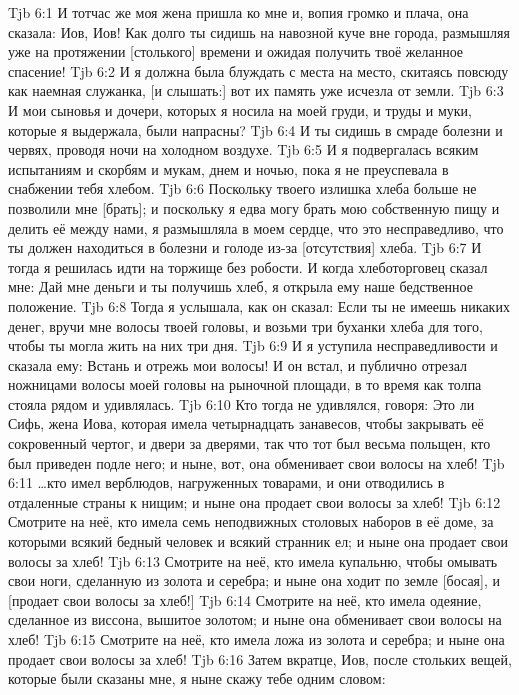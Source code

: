 \vs Tjb 6:1
И тотчас же моя жена пришла ко мне и, вопия громко и плача, она сказала: Иов, Иов! Как долго ты сидишь на навозной куче вне города, размышляя уже на протяжении [столького] времени и ожидая получить твоё желанное спасение!
\vs Tjb 6:2
И я должна была блуждать с места на место, скитаясь повсюду как наемная служанка, [и слышать:] вот их память уже исчезла от земли.
\vs Tjb 6:3
И мои сыновья и дочери, которых я носила на моей груди, и труды и муки, которые я выдержала, были напрасны?
\vs Tjb 6:4
И ты сидишь в смраде болезни и червях, проводя ночи на холодном воздухе.
\vs Tjb 6:5
И я подвергалась всяким испытаниям и скорбям и мукам, днем и ночью, пока я не преуспевала в снабжении тебя хлебом.
\vs Tjb 6:6
Поскольку твоего излишка хлеба больше не позволили мне [брать]; и поскольку я едва могу брать мою собственную пищу и делить её между нами, я размышляла в моем сердце, что это несправедливо, что ты должен находиться в болезни и голоде из-за [отсутствия] хлеба.
\vs Tjb 6:7
И тогда я решилась идти на торжище без робости. И когда хлеботорговец сказал мне: Дай мне деньги и ты получишь хлеб, я открыла ему наше бедственное положение.
\vs Tjb 6:8
Тогда я услышала, как он сказал: Если ты не имеешь никаких денег, вручи мне волосы твоей головы, и возьми три буханки хлеба для того, чтобы ты могла жить на них три дня.
\vs Tjb 6:9
И я уступила несправедливости и сказала ему: Встань и отрежь мои волосы! И он встал, и публично отрезал ножницами волосы моей головы на рыночной площади, в то время как толпа стояла рядом и удивлялась.
\vs Tjb 6:10
Кто тогда не удивлялся, говоря: Это ли Сифь, жена Иова, которая имела четырнадцать занавесов, чтобы закрывать её сокровенный чертог, и двери за дверями, так что тот был весьма польщен, кто был приведен подле него; и ныне, вот, она обменивает свои волосы на хлеб!
\vs Tjb 6:11
\ldots кто имел верблюдов, нагруженных товарами, и они отводились в отдаленные страны к нищим; и ныне она продает свои волосы за хлеб!
\vs Tjb 6:12
Смотрите на неё, кто имела семь неподвижных столовых наборов в её доме, за которыми всякий бедный человек и всякий странник ел; и ныне она продает свои волосы за хлеб!
\vs Tjb 6:13
Смотрите на неё, кто имела купальню, чтобы омывать свои ноги, сделанную из золота и серебра; и ныне она ходит по земле [босая], и [продает свои волосы за хлеб!]
\vs Tjb 6:14
Смотрите на неё, кто имела одеяние, сделанное из виссона, вышитое золотом; и ныне она обменивает свои волосы на хлеб!
\vs Tjb 6:15
Смотрите на неё, кто имела ложа из золота и серебра; и ныне она продает свои волосы за хлеб!
\vs Tjb 6:16
Затем вкратце, Иов, после стольких вещей, которые были сказаны мне, я ныне скажу тебе одним словом:
